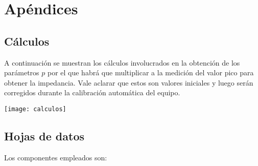 \section{Apéndices}

\subsection{Cálculos}
A continuación se muestran los cálculos involucrados en la obtención de los parámetros $p$ por el que habrá que multiplicar a la medición del valor pico para obtener la impedancia. Vale aclarar que estos son valores iniciales y luego serán corregidos durante la calibración automática del equipo.

\hspace{-1cm}
\texttt{[image: calculos]}

\subsection{Hojas de datos}

Los componentes empleados son:

